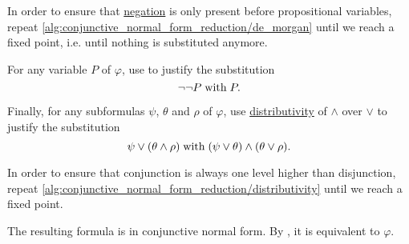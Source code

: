 \begin{algorithm}
\begin{thmenum}
    In order to ensure that \hyperref[def:propositional_language/negation]{negation} is only present before propositional variables, repeat \ref{alg:conjunctive_normal_form_reduction/de_morgan} until we reach a fixed point, i.e. until nothing is substituted anymore.

     For any variable \( P \) of \( \varphi \), use  to justify the substitution
    \begin{equation*}
      \neg \neg P \thickspace \text{with} \thickspace P.
    \end{equation*}

     Finally, for any subformulas \( \psi \), \( \theta \) and \( \rho \) of \( \varphi \), use \hyperref[eq:def:distributive_lattice/distributivity]{distributivity} of \( \wedge \) over \( \vee \) to justify the substitution
    \begin{equation*}
      \psi \vee (\theta \wedge \rho) \thickspace \text{with} \thickspace (\psi \vee \theta) \wedge (\theta \vee \rho).
    \end{equation*}

    In order to ensure that conjunction is always one level higher than disjunction, repeat \ref{alg:conjunctive_normal_form_reduction/distributivity} until we reach a fixed point.
  \end{thmenum}

  The resulting formula is in conjunctive normal form. By , it is equivalent to \( \varphi \).
\end{algorithm}
